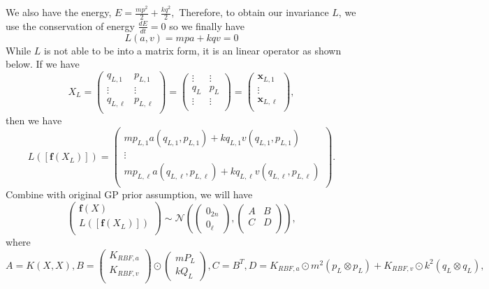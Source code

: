 \documentclass{statsmsc}
\begin{document}
We also have the energy, $E=\frac{mp^2}{2}+\frac{kq^2}{2},$
Therefore, to obtain our invariance $L$, we use the conservation of energy $\frac{dE}{dt}=0$ so we finally have $$L(a, v)=mpa+kqv=0$$
While $L$ is not able to be into a matrix form, it is an linear operator as shown below. 
If we have $$X_L=\begin{pmatrix}
    q_{L,1} & p_{L,1}\\
    \vdots & \vdots \\
    q_{L,\ell} & p_{L,\ell}\\
\end{pmatrix}=\begin{pmatrix}
    \vdots & \vdots\\
    q_L & p_L\\
    \vdots & \vdots\\
\end{pmatrix}=\begin{pmatrix}
    \mathbf{x}_{L,1}\\
    \vdots\\
    \mathbf{x}_{L,\ell}\\
\end{pmatrix},$$
then we have 
$$
L([\mathbf{f}(X_L)]) = \begin{pmatrix}
   mp_{L,1}a(q_{L,1},p_{L,1}) + kq_{L,1}v(q_{L,1},p_{L,1})\\ 
   \vdots \\
   mp_{L,\ell}a(q_{L,\ell},p_{L,\ell}) + kq_{L,\ell}v(q_{L,\ell},p_{L,\ell})\\ 
\end{pmatrix}.
$$
Combine with original GP prior assumption, we will have 
$$
\begin{pmatrix}
    \mathbf{f}(X)\\
    L([\mathbf{f}(X_L)])\\
\end{pmatrix}
\sim\mathcal{N}
\left(\begin{pmatrix}
    0_{2n}\\0_{\ell}
\end{pmatrix},\begin{pmatrix}
   A & B \\
   C & D\\ 
\end{pmatrix}\right),
$$
where
$$
A=K(X,X), B=\begin{pmatrix}
    K_{RBF,a} \\ K_{RBF,v} \\
\end{pmatrix}\odot \begin{pmatrix}
    mP_L \\ kQ_L
\end{pmatrix}, C=B^T, D=K_{RBF,a}\odot m^2(p_L\otimes p_L) + K_{RBF,v}\odot k^2(q_L\otimes q_L),
$$
\end{document}
